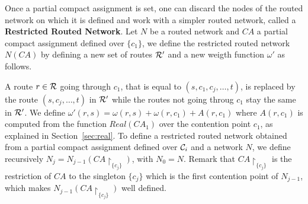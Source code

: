 Once a partial compact assignment is set, one can discard the nodes of the routed network on which it is defined
and work with a simpler routed network, called a \textbf{Restricted Routed Network}. Let $N$ be a routed network
and $CA$ a partial compact assignment defined over $\{c_1\}$, we define the restricted routed network $N(CA)$ by defining a new set of routes ${\cal R}'$ and a new weigth function $\omega'$ as follows. 


A route $r \in {\cal R}$ going through $c_1$, that is equal to $(s,c_1,c_j,\ldots,t)$,  is replaced by the route $(s,c_j,\ldots,t)$ in ${\cal R}'$ while the routes not going throug $c_1$ stay the same in ${\cal R}'$. We define $\omega'(r,s) = \omega(r,s)+\omega(r,c_1) + A(r,c_1)$ where $A(r,c_1)$ is computed from the function $Real(CA_1)$ over the contention point $c_1$, as explained in Section~\ref{sec:real}. To define a restricted routed network obtained from a partial compact assignment defined over ${\cal C}_i$ and a network $N$, we define recursively $N_j = N_{j-1}(CA\restriction_{\{c_j\}})$, with $N_0 = N$. Remark that $CA\restriction_{\{c_j\}}$ is the restriction of $CA$ to the singleton $\{c_j\}$ which is the first contention point of $N_{j-1}$, which makes $N_{j-1}(CA\restriction_{\{c_j\}})$ well defined.



